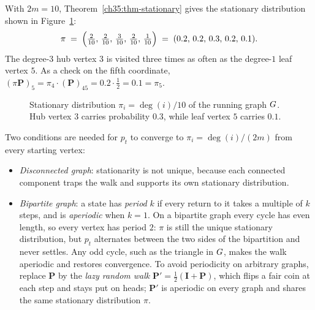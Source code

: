 \begin{example}\label{ch35:ex-stationary}
With $2m=10$, Theorem~\ref{ch35:thm-stationary} gives the stationary distribution shown in Figure~\ref{ch35:fig-stationary}:
\[
  \pi \;=\; \Bigl(\tfrac{2}{10},\,\tfrac{2}{10},\,\tfrac{3}{10},\,\tfrac{2}{10},\,\tfrac{1}{10}\Bigr)
  \;=\; (0.2,\,0.2,\,0.3,\,0.2,\,0.1).
\]
The degree-$3$ hub vertex $3$ is visited three times as often as the degree-$1$ leaf vertex $5$. As a check on the fifth coordinate, $(\pi\mathbf{P})_5 = \pi_4\cdot(\mathbf{P})_{45}=0.2\cdot\tfrac12=0.1=\pi_5$.

\begin{figure}[htbp]
\centering
{}
\caption{Stationary distribution $\pi_i = \deg(i)/10$ of the running graph $G$. Hub vertex $3$ carries probability $0.3$, while leaf vertex $5$ carries $0.1$.}
\label{ch35:fig-stationary}
\end{figure}
\end{example}

\begin{trapbox}
Two conditions are needed for $p_t$ to converge to $\pi_i=\deg(i)/(2m)$ from every starting vertex:
\begin{itemize}
  \item \emph{Disconnected graph}: stationarity is not unique, because each connected component traps the walk and supports its own stationary distribution.
  \item \emph{Bipartite graph}: a state has \emph{period} $k$ if every return to it takes a multiple of $k$ steps, and is \emph{aperiodic} when $k=1$. On a bipartite graph every cycle has even length, so every vertex has period $2$: $\pi$ is still the unique stationary distribution, but $p_t$ alternates between the two sides of the bipartition and never settles. Any odd cycle, such as the triangle in $G$, makes the walk aperiodic and restores convergence. To avoid periodicity on arbitrary graphs, replace $\mathbf{P}$ by the \emph{lazy random walk} $\mathbf{P}'=\tfrac12(\mathbf{I}+\mathbf{P})$, which flips a fair coin at each step and stays put on heads; $\mathbf{P}'$ is aperiodic on every graph and shares the same stationary distribution $\pi$.
\end{itemize}
\end{trapbox}

